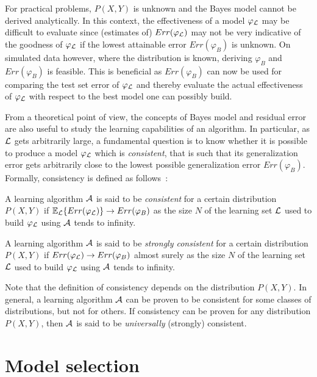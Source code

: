 For practical problems, $P(X, Y)$ is unknown and the Bayes model cannot be
derived analytically. In this context, the effectiveness of a model $\varphi_{\cal L}$
may be difficult to evaluate since (estimates of) $Err(\varphi_{\cal L})$ may
not be very indicative of the goodness of $\varphi_{\cal L}$ if the lowest attainable
error $Err(\varphi_B)$ is unknown. On simulated data however, where the
distribution is known, deriving $\varphi_B$ and $Err(\varphi_B)$ is feasible.
This is beneficial as $Err(\varphi_B)$ can now be used for comparing the test
set error of $\varphi_{\cal L}$ and thereby evaluate the actual effectiveness of
$\varphi_{\cal L}$ with respect to the best model one can possibly build.

From a theoretical point of view, the concepts of Bayes model and residual
error are also useful to study the learning capabilities of an algorithm. In
particular, as ${\cal L}$ gets arbitrarily large, a fundamental question is to
know whether it is possible to produce a model $\varphi_{\cal L}$ which is
\textit{consistent}, that is such that its generalization error gets
arbitrarily close to the lowest possible generalization error $Err(\varphi_B)$.
Formally, consistency is defined as follows~\citep{devroye:1996}:

\begin{definition}
A learning algorithm ${\cal A}$ is said to be \emph{consistent} for a certain distribution
$P(X, Y)$ if $\mathbb{E}_{\cal L} \{ Err(\varphi_{\cal L}) \} \to Err(\varphi_B)$
as the size $N$ of the learning set ${\cal L}$ used to build $\varphi_{\cal L}$ using ${\cal A}$ tends
to infinity.
\end{definition}

\begin{definition}
A learning algorithm ${\cal A}$ is said to be \emph{strongly consistent} for a certain distribution
$P(X, Y)$ if $Err(\varphi_{\cal L}) \to Err(\varphi_B)$ almost surely
as the size $N$ of the learning set ${\cal L}$ used to build $\varphi_{\cal L}$ using ${\cal A}$ tends
to infinity.
\end{definition}

Note that the definition of consistency depends on the distribution $P(X, Y)$.
In general, a learning algorithm ${\cal A}$ can be proven to be consistent for some
classes of distributions, but not for others. If consistency can be proven
for any distribution $P(X, Y)$, then ${\cal A}$ is said to be \textit{universally}
(strongly) consistent.


\section{Model selection}
\label{sec:2:model-selection}

